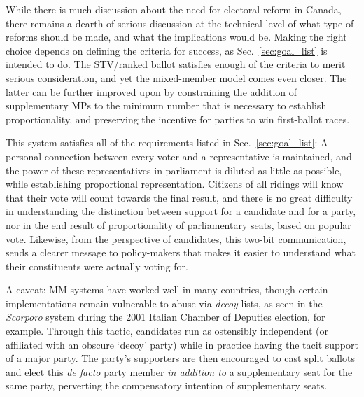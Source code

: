 \documentclass[DIV=calc, paper=a4, fontsize=11pt, twocolumn]{scrartcl}	 %
\begin{document}
While there is much discussion about the need for electoral reform in Canada, there remains a dearth of serious discussion at the technical level of what type of reforms should be made, and what the implications would be. 
Making the right choice depends on defining the criteria for success, as Sec.~\ref{sec:goal_list} is intended to do.  
The STV/ranked ballot satisfies enough of the criteria to merit serious consideration, and yet the mixed-member model comes even closer. 
The latter can be further improved upon by constraining the addition of supplementary MPs to the minimum number that is necessary to establish proportionality, and preserving the incentive for parties to win first-ballot races.

This system satisfies all of the requirements listed in Sec.~\ref{sec:goal_list}: A personal connection between every voter and a representative is maintained, and the power of these representatives in parliament is diluted as little as possible, while establishing proportional representation. 
Citizens of all ridings will know that their vote will count towards the final result, and there is no great difficulty in understanding the  distinction between support for a candidate and for a party, nor in the end result of proportionality of parliamentary seats, based on popular vote.
Likewise, from the perspective of candidates, this two-bit communication, sends a clearer message to policy-makers that makes it easier to understand what their constituents were actually voting for.

A caveat: MM systems have worked well in many countries, though certain implementations remain vulnerable to abuse via \emph{decoy} lists, as seen in the \emph{Scorporo} system during the 2001 Italian Chamber of Deputies election, for example.
Through this tactic, candidates run as ostensibly independent (or affiliated with an obscure `decoy' party) while in practice having the tacit support of a major party.
The party's supporters are then encouraged to cast split ballots and elect this \emph{de facto} party member \emph{in addition to} a supplementary seat for the same party, perverting the compensatory intention of supplementary seats.
\end{document}
